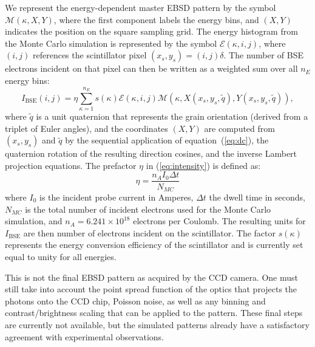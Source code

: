 \documentclass[DIV=calc, paper=letter, fontsize=11pt]{scrartcl}	 %
\begin{document}
We represent the energy-dependent master EBSD pattern by the symbol $\mathcal{M}(\kappa,X,Y)$,  where the first component labels the energy bins, 
and $(X,Y)$ indicates the position on the square sampling grid.   The energy histogram from the Monte Carlo simulation is represented by the symbol
$\mathcal{E}(\kappa,i,j)$, where $(i,j)$ references the scintillator pixel $(x_s,y_s)=(i,j)\delta$.  The number of BSE electrons incident on that pixel can then be written as
a weighted sum over all $n_E$ energy bins:
\begin{equation}
	I_{\text{BSE}}(i,j) = \eta\sum_{\kappa=1}^{n_E} s(\kappa)\mathcal{E}(\kappa,i,j) \mathcal{M}\left(\kappa,X(x_s,y_s,\tilde{q}),Y(x_s,y_s,\tilde{q})\right),\label{eq:intensity}
\end{equation}
where $\tilde{q}$ is a unit quaternion that represents the grain orientation (derived from a triplet of Euler angles), and the coordinates 
$(X,Y)$ are computed from $(x_s,y_s)$ and $\tilde{q}$ by the sequential application of equation~(\ref{eq:dc}), the quaternion rotation of the resulting
direction cosines, and the inverse Lambert projection equations.  The prefactor $\eta$ in (\ref{eq:intensity}) is defined as:
\begin{equation}
	\eta = \frac{n_A I_0 \Delta t}{N_{MC}}
\end{equation}
where $I_0$ is the incident probe current in Amperes, $\Delta t$ the dwell time in seconds, $N_{MC}$ is the total number of incident electrons
used for the Monte Carlo simulation, and $n_A=6.241\times 10^{18}$ electrons per Coulomb.  The resulting units for $I_{\text{BSE}}$ are then number of  
electrons incident on the scintillator.  The factor $s(\kappa)$ represents the energy conversion efficiency of the scintillator and is currently set equal to unity
for all energies.

This is not the final EBSD pattern as acquired by the CCD camera.  One must still take into account the point spread function of the 
optics that projects the photons onto the CCD chip, Poisson noise, as well as any binning and contrast/brightness scaling that can 
be applied to the pattern. These final steps are currently not available, %
but the simulated patterns already have a satisfactory agreement with experimental observations.
\end{document}
